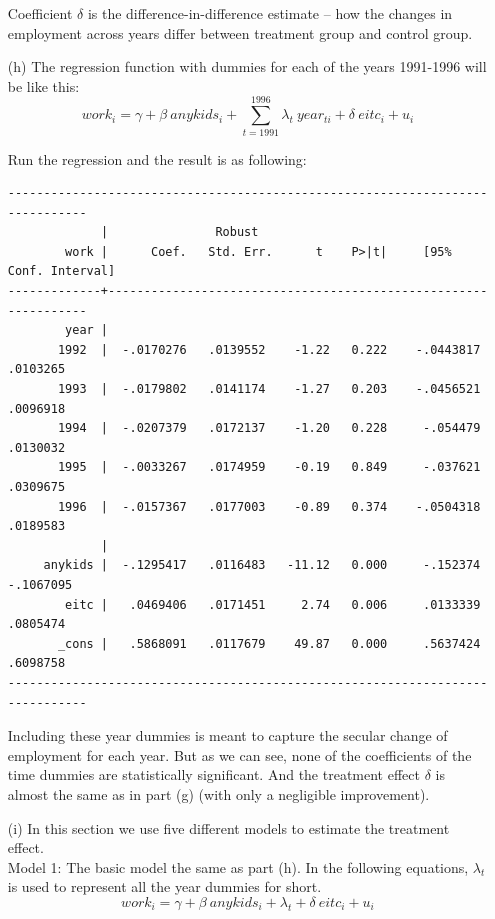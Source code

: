 \documentclass{article}
\begin{document}
\begin{enumerate}
Coefficient $\delta$ is the difference-in-difference estimate -- how the changes in employment across years 
differ between treatment group and control group. \\


\item[(h)] The regression function  with dummies for each of the years 1991-1996 will be like this:
$$ work_i = \gamma + \beta\ anykids_i + \sum_{t=1991}^{1996}\lambda_t\ year_{ti} + \delta\ eitc_i + u_i $$

Run the regression and the result is as following:

\begin{verbatim}
------------------------------------------------------------------------------
             |               Robust
        work |      Coef.   Std. Err.      t    P>|t|     [95% Conf. Interval]
-------------+----------------------------------------------------------------
        year |
       1992  |  -.0170276   .0139552    -1.22   0.222    -.0443817    .0103265
       1993  |  -.0179802   .0141174    -1.27   0.203    -.0456521    .0096918
       1994  |  -.0207379   .0172137    -1.20   0.228     -.054479    .0130032
       1995  |  -.0033267   .0174959    -0.19   0.849     -.037621    .0309675
       1996  |  -.0157367   .0177003    -0.89   0.374    -.0504318    .0189583
             |
     anykids |  -.1295417   .0116483   -11.12   0.000     -.152374   -.1067095
        eitc |   .0469406   .0171451     2.74   0.006     .0133339    .0805474
       _cons |   .5868091   .0117679    49.87   0.000     .5637424    .6098758
------------------------------------------------------------------------------
\end{verbatim}

Including these year dummies is meant to capture the secular change of employment for each year.
But as we can see, none of the coefficients of the time dummies are statistically significant.
And the treatment effect $\delta$ is almost the same as in part (g) (with only a negligible 
improvement). \\

\item[(i)] In this section we use five different models to estimate the treatment effect.\\

Model 1: The basic model the same as part (h). In the following equations, $\lambda_t$ is used to 
represent all the year dummies for short.
$$ work_i = \gamma + \beta\ anykids_i + \lambda_t + \delta\ eitc_i + u_i $$


\end{enumerate}
\end{document}
